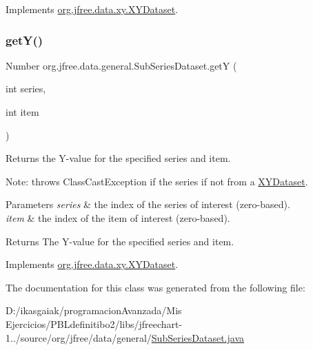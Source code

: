 Implements \mbox{\hyperlink{interfaceorg_1_1jfree_1_1data_1_1xy_1_1_x_y_dataset_a85c75ba5b69b551e96afd29d1732ba22}{org.\+jfree.\+data.\+xy.\+X\+Y\+Dataset}}.

\mbox{\label{classorg_1_1jfree_1_1data_1_1general_1_1_sub_series_dataset_a64188cebb42182d6637bf4c39d3075eb}} 
\subsubsection{\texorpdfstring{get\+Y()}{getY()}}
{\footnotesize\ttfamily Number org.\+jfree.\+data.\+general.\+Sub\+Series\+Dataset.\+getY (\begin{DoxyParamCaption}\item[{int}]{series,  }\item[{int}]{item }\end{DoxyParamCaption})}

Returns the Y-\/value for the specified series and item. 

Note\+: throws {\ttfamily Class\+Cast\+Exception} if the series if not from a \mbox{\hyperlink{}{X\+Y\+Dataset}}.


\begin{DoxyParams}{Parameters}
{\em series} & the index of the series of interest (zero-\/based). \\
\hline
{\em item} & the index of the item of interest (zero-\/based).\\
\hline
\end{DoxyParams}
\begin{DoxyReturn}{Returns}
The Y-\/value for the specified series and item. 
\end{DoxyReturn}


Implements \mbox{\hyperlink{interfaceorg_1_1jfree_1_1data_1_1xy_1_1_x_y_dataset_aa915867221e0f94021bad3140db5254e}{org.\+jfree.\+data.\+xy.\+X\+Y\+Dataset}}.



The documentation for this class was generated from the following file\+:\begin{DoxyCompactItemize}
\item 
D\+:/ikasgaiak/programacion\+Avanzada/\+Mis Ejercicios/\+P\+B\+Ldefinitibo2/libs/jfreechart-\/1../source/org/jfree/data/general/\mbox{\hyperlink{_sub_series_dataset_8java}{Sub\+Series\+Dataset.\+java}}\end{DoxyCompactItemize}
